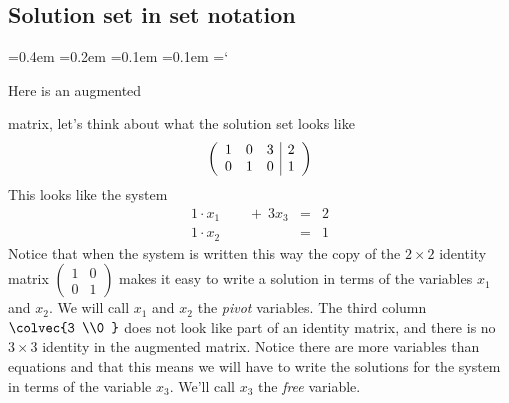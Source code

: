 
\subsection*{Solution set in set notation}
{\ttfamily
{}\font=0.4em
\font=0.2em
\font=0.1em
\font=0.1em
\hyphenchar\font=`\-


\hypertarget{solution_sets_for_systems_of_linear_equations_example}{Here is an augmented} matrix, let's think about what the solution set looks like
\[ \left( \begin{array}{ccc | c}
1 & 0 & 3 & 2 \\
0 & 1 & 0 & 1
\end{array} \right)
\]
This looks like the system
\begin{eqnarray*}
1\cdot x_1\phantom{+x_2}\ + \ 3x_3 &=& 2\\
 1\cdot x_2\phantom{\ +\ 3x_3 } &=& 1
\end{eqnarray*}
Notice that when the system is written this way the copy of the $2 \times 2$ identity matrix
$
\left( \begin{array}{cc}
1 & 0  \\ 0 & 1
\end{array} \right)
$
makes it easy to write a solution in terms of the variables $x_1$ and $x_2$. We will call  $x_1$ and $x_2$ the \emph{pivot} variables. The third column $\colvec{3 \\0 }$ does not look like part of an identity matrix, and there is no $3\times 3$ identity in the augmented matrix. Notice there are more variables than equations and  that this means we will have to write the solutions for the system in terms of the variable $x_3$. We'll call $x_3$ the \emph{free} variable.

}
